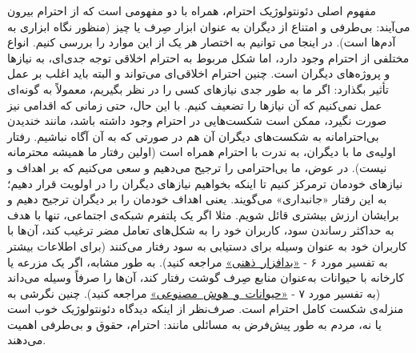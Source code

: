 مفهوم اصلی دئونتولوژیک احترام، همراه با دو مفهومی است که از احترام بیرون می‌آیند: بی‌طرفی و امتناع از دیگران به عنوان ابزار صِرف یا چیز (منظور نگاه ابزاری به آدم‌ها است).
در اینجا می توانیم به اختصار هر یک از این موارد را بررسی کنیم.
انواع مختلفی از احترام وجود دارد، اما شکل مربوط به احترام اخلاقی توجه جدی‌ای، به نیازها و پروژه‌های دیگران است.
چنین احترام اخلاقی‌ای می‌تواند و البته باید اغلب بر عمل تأثیر بگذارد: اگر ما به طور جدی نیازهای کسی را در نظر بگیریم، معمولاً به گونه‌ای عمل نمی‌کنیم که آن نیازها را تضعیف کنیم.
با این حال، حتی زمانی که اقدامی نیز صورت نگیرد، ممکن است شکست‌هایی در احترام وجود داشته باشد، مانند خندیدن بی‌احترامانه به شکست‌های دیگران آن هم در صورتی که به آن آگاه نباشیم.
رفتار اولیه‌ی ما با دیگران، به ندرت با احترام همراه است (اولین رفتار ما همیشه محترمانه نیست).
در عوض، ما بی‌احترامی را ترجیح می‌دهیم و سعی می‌کنیم که بر اهداف و نیازهای خودمان ترمرکز کنیم تا اینکه بخواهیم نیازهای دیگران را در اولویت قرار دهیم؛ به این رفتار «جانبداری» می‌گویند.
یعنی اهداف خودمان را بر دیگران ترجیح دهیم و برایشان ارزش بیشتری قائل شویم.
مثلا اگر یک پلتفرم شبکه‌ی اجتماعی، تنها با هدف به حداکثر رساندن سود، کاربران خود را به شکل‌های تعامل مضر ترغیب کند، آن‌ها با کاربران خود به عنوان وسیله برای دستیابی به سود رفتار می‌کنند (برای اطلاعات بیشتر به تفسیر مورد ۶ - \hyperref[subsec:مورد۶ - بدافزار ذهنی: الگوریتم‌ها و معماری انتخاب]{\mbox{«بدافزار ذهنی»}} مراجعه کنید).
به طور مشابه، اگر یک مزرعه یا کارخانه با حیوانات به‌عنوان منابع صِرف گوشت رفتار کند، آن‌ها را صرفاً وسیله می‌داند (به تفسیر مورد ۷ - \hyperref[subsec:مورد۷ - هوش مصنوعی و موجودات غیر انسان]{\mbox{«حیوانات و هوش مصنوعی»}} مراجعه کنید).
چنین نگرشی به منزله‌ی شکست کامل احترام است.
صرف‌نظر از اینکه دیدگاه دئونتولوژیک خوب است یا نه، مردم به طور پیش‌فرض به مسائلی مانند: احترام، حقوق و بی‌طرفی اهمیت می‌دهند.
\newline
\newline


